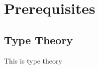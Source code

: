 \chapter{Prerequisites}

\begin{code}%
%
\>[2]\AgdaSpace{}%
\AgdaSpace{}%
\<%
\end{code}

\section{Type Theory}

This is type theory
